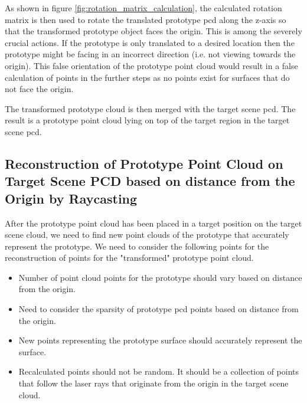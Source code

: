 As shown in figure \ref{fig:rotation_matrix_calculation}, the calculated rotation matrix is then used to rotate the translated prototype \acrshort{pcd} along the z-axis so that the transformed prototype object faces the origin. This is among the severely crucial actions. If the prototype is only translated to a desired location then the prototype might be facing in an incorrect direction (i.e. not viewing towards the origin). This false orientation of the prototype point cloud would result in a false calculation of points in the further steps as no points exist for surfaces that do not face the origin.

The transformed prototype cloud is then merged with the target scene \acrshort{pcd}. The result is a prototype point cloud lying on top of the target region in the target scene \acrshort{pcd}.


\subsection{Reconstruction of Prototype Point Cloud on Target Scene PCD based on distance from the Origin by Raycasting}

After the prototype point cloud has been placed in a target position on the target scene cloud, we need to find new point clouds of the prototype that accurately represent the prototype. We need to consider the following points for the reconstruction of points for the "transformed" prototype point cloud.
\begin{itemize}
    \item Number of point cloud points for the prototype should vary based on distance from the origin.
    \item Need to consider the sparsity of prototype \acrshort{pcd} points based on distance from the origin.
    \item New points representing the prototype surface should accurately represent the surface.
    \item Recalculated points should not be random. It should be a collection of points that follow the laser rays that originate from the origin in the target scene cloud.
\end{itemize}

